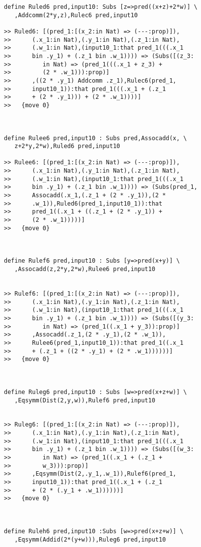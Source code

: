 \documentclass{article}
\begin{document}
\begin{verbatim}
define Ruled6 pred,input10: Subs [z=>pred((x+z)+2*w)] \
   ,Addcomm(2*y,z),Rulec6 pred,input10

>> Ruled6: [(pred_1:[(x_2:in Nat) => (---:prop)]),
>>      (.x_1:in Nat),(.y_1:in Nat),(.z_1:in Nat),
>>      (.w_1:in Nat),(input10_1:that pred_1(((.x_1
>>      bin .y_1) + (.z_1 bin .w_1)))) => (Subs([(z_3:
>>         in Nat) => (pred_1(((.x_1 + z_3) +
>>         (2 * .w_1))):prop)]
>>      ,((2 * .y_1) Addcomm .z_1),Rulec6(pred_1,
>>      input10_1)):that pred_1(((.x_1 + (.z_1
>>      + (2 * .y_1))) + (2 * .w_1))))]
>>   {move 0}



define Rulee6 pred,input10 : Subs pred,Assocadd(x, \
   z+2*y,2*w),Ruled6 pred,input10

>> Rulee6: [(pred_1:[(x_2:in Nat) => (---:prop)]),
>>      (.x_1:in Nat),(.y_1:in Nat),(.z_1:in Nat),
>>      (.w_1:in Nat),(input10_1:that pred_1(((.x_1
>>      bin .y_1) + (.z_1 bin .w_1)))) => (Subs(pred_1,
>>      Assocadd(.x_1,(.z_1 + (2 * .y_1)),(2 *
>>      .w_1)),Ruled6(pred_1,input10_1)):that
>>      pred_1((.x_1 + ((.z_1 + (2 * .y_1)) +
>>      (2 * .w_1)))))]
>>   {move 0}



define Rulef6 pred,input10 : Subs [y=>pred(x+y)] \
   ,Assocadd(z,2*y,2*w),Rulee6 pred,input10


>> Rulef6: [(pred_1:[(x_2:in Nat) => (---:prop)]),
>>      (.x_1:in Nat),(.y_1:in Nat),(.z_1:in Nat),
>>      (.w_1:in Nat),(input10_1:that pred_1(((.x_1
>>      bin .y_1) + (.z_1 bin .w_1)))) => (Subs([(y_3:
>>         in Nat) => (pred_1((.x_1 + y_3)):prop)]
>>      ,Assocadd(.z_1,(2 * .y_1),(2 * .w_1)),
>>      Rulee6(pred_1,input10_1)):that pred_1((.x_1
>>      + (.z_1 + ((2 * .y_1) + (2 * .w_1))))))]
>>   {move 0}



define Ruleg6 pred,input10 : Subs [w=>pred(x+z+w)] \
   ,Eqsymm(Dist(2,y,w)),Rulef6 pred,input10


>> Ruleg6: [(pred_1:[(x_2:in Nat) => (---:prop)]),
>>      (.x_1:in Nat),(.y_1:in Nat),(.z_1:in Nat),
>>      (.w_1:in Nat),(input10_1:that pred_1(((.x_1
>>      bin .y_1) + (.z_1 bin .w_1)))) => (Subs([(w_3:
>>         in Nat) => (pred_1((.x_1 + (.z_1 +
>>         w_3))):prop)]
>>      ,Eqsymm(Dist(2,.y_1,.w_1)),Rulef6(pred_1,
>>      input10_1)):that pred_1((.x_1 + (.z_1
>>      + (2 * (.y_1 + .w_1))))))]
>>   {move 0}



define Ruleh6 pred,input10 :Subs [w=>pred(x+z+w)] \
   ,Eqsymm(Addid(2*(y+w))),Ruleg6 pred,input10



\end{verbatim}
\end{document}
